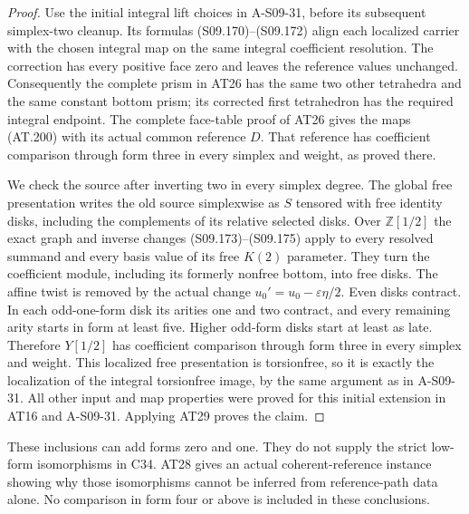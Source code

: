 \begin{proof}
Use the initial integral lift choices in A-S09-31, before its
subsequent simplex-two cleanup. Its formulas (S09.170)--(S09.172)
align each localized carrier with the chosen integral map on the
same integral coefficient resolution. The correction has every
positive face zero and leaves the reference values unchanged.
Consequently the complete prism in AT26 has the same two other
tetrahedra and the same constant bottom prism; its corrected first
tetrahedron has the required integral endpoint. The complete
face-table proof of AT26 gives the maps \textup{(AT.200)} with
its actual common reference $D$.
That reference has coefficient comparison through form three
in every simplex and weight, as proved there.

We check the source after inverting two in every simplex degree.
The global free presentation writes the old source simplexwise
as $S$ tensored with free identity disks, including the complements
of its relative selected disks. Over $\mathbb Z[1/2]$ the exact
graph and inverse changes (S09.173)--(S09.175) apply to every
resolved summand and every basis value of its free $K(2)$ parameter.
They turn the coefficient module, including its formerly nonfree
bottom, into free disks. The affine twist is removed by the actual
change $u_0'=u_0-\varepsilon\eta/2$.
Even disks contract. In each odd-one-form disk its arities one
and two contract, and every remaining arity starts in form at
least five. Higher odd-form disks start at least as late.
Therefore $Y[1/2]$ has coefficient comparison through form three
in every simplex and weight. This localized free presentation is
torsionfree, so it is exactly the localization of the integral
torsionfree image, by the same argument as in A-S09-31.
All other input and map properties were proved for this initial
extension in AT16 and A-S09-31. Applying AT29 proves the claim.
\end{proof}

These inclusions can add forms zero and one. They do not supply
the strict low-form isomorphisms in C34. AT28 gives an actual
coherent-reference instance showing why those isomorphisms cannot
be inferred from reference-path data alone. No comparison in form
four or above is included in these conclusions.
